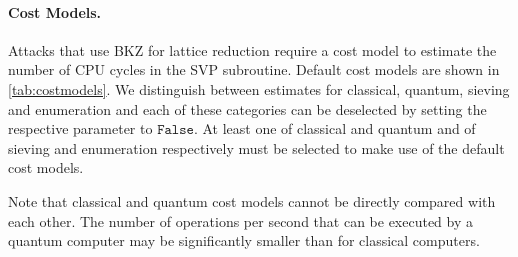 \paragraph{Cost Models.} \label{sec:tool-costmodels} Attacks that use BKZ for lattice reduction require a cost model to estimate the number of CPU cycles in the SVP subroutine. Default cost models are shown in \cref{tab:costmodels}. We distinguish between estimates for classical, quantum, sieving and enumeration and each of these categories can be deselected by setting the respective parameter to $\texttt{False}$. At least one of classical and quantum and of sieving and enumeration respectively must be selected to make use of the default cost models.

Note that classical and quantum cost models cannot be directly compared with each other. The number of operations per second that can be executed by a quantum computer may be significantly smaller than for classical computers. %

